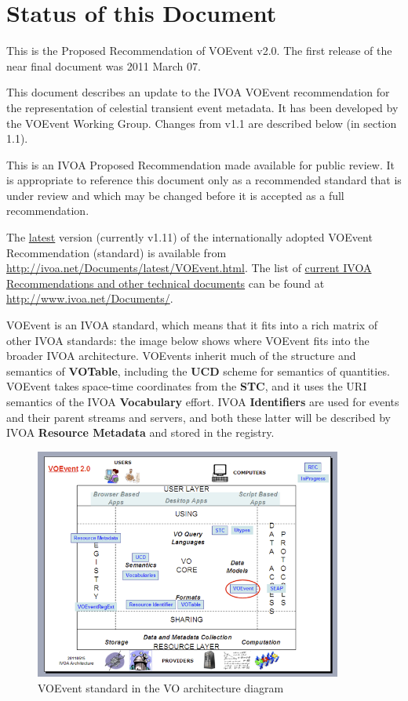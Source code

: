 \documentclass[11pt,a4paper]{ivoa}
\begin{document}
\section*{Status of this Document}
This is the Proposed Recommendation of VOEvent v2.0. The first release of the near final document was 2011 March 07.

This document describes an update to the IVOA VOEvent recommendation for the representation of celestial transient event metadata. It has been developed by the VOEvent Working Group. Changes from v1.1 are described below (in section 1.1). 

This is an IVOA Proposed Recommendation made available for public review. It is appropriate to reference this document only as a recommended standard that is under review and which may be changed before it is accepted as a full recommendation.


The \href{http://ivoa.net/Documents/latest/VOEvent.html}{latest} version (currently v1.11) of the internationally adopted VOEvent Recommendation (standard) is available from \url{http://ivoa.net/Documents/latest/VOEvent.html}. The list of \href{http://www.ivoa.net/Documents/}{current IVOA Recommendations and other technical documents} can be found at \url{http://www.ivoa.net/Documents/}.

VOEvent is an IVOA standard, which means that it fits into a rich matrix of other IVOA standards: the image below shows where VOEvent fits into the broader IVOA architecture. VOEvents inherit much of the structure and semantics of {\bf VOTable}, including the {\bf UCD} scheme for semantics of quantities. VOEvent takes space-time coordinates from the {\bf STC}, and it uses the URI semantics of the IVOA {\bf Vocabulary} effort. IVOA {\bf Identifiers} are used for events and their parent streams and servers, and both these latter will be described by IVOA {\bf Resource Metadata} and stored in the registry. 

\begin{figure}[ht!]
\centering\includegraphics[width=0.9\textwidth]{role_diagram_orig.png}
\caption{VOEvent standard in the VO architecture diagram}
\label{fig:diagram}
\end{figure}
\end{document}
